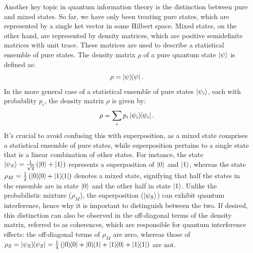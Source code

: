 Another key topic in quantum information theory is the distinction between pure and mixed states. So far, we have only been treating pure states, which are represented by a single ket vector in some Hilbert space. Mixed states, on the other hand, are represented by density matrices, which are positive semidefinite matrices with unit trace. These matrices are used to describe a statistical ensemble of pure states. The density matrix $\rho$ of a pure quantum state $\ket{\psi}$ is defined as:
\begin{equation}
  \rho = \dyad{\psi}{\psi}.
\end{equation}
In the more general case of a statistical ensemble of pure states $\ket{\psi_i}$, each with probability $p_i$, the density matrix $\rho$ is given by:
\begin{equation}
  \rho = \sum_i p_i \dyad{\psi_i}{\psi_i}.
\end{equation}
It's crucial to avoid confusing this with superposition, as a mixed state comprises a statistical ensemble of pure states, while superposition pertains to a single state that is a linear combination of other states. For instance, the state $\ket{\psi_S} = \frac{1}{\sqrt{2}}\left(\ket{0} + \ket{1}\right)$ represents a superposition of $\ket{0}$ and $\ket{1}$, whereas the state $\rho_M = \frac{1}{2}\left(\dyad{0}{0} + \dyad{1}{1}\right)$ denotes a mixed state, signifying that half the states in the ensemble are in state $\ket{0}$ and the other half in state $\ket{1}$. Unlike the probabilistic mixture ($\rho_M$), the superposition ($\ket{\psi_S}$) can exhibit quantum interference, hence why it is important to distinguish between the two. If desired, this distinction can also be observed in the off-diagonal terms of the density matrix, referred to as coherences, which are responsible for quantum interference effects: the off-diagonal terms of $\rho_{M}$ are zero, whereas those of $\rho_{S} = \dyad{\psi_S}{\psi_S} = \frac{1}{4}\left(\dyad{0}{0} + \dyad{0}{1} + \dyad{1}{0} + \dyad{1}{1}\right)$ are not.

\vspace*{-2.5mm}
